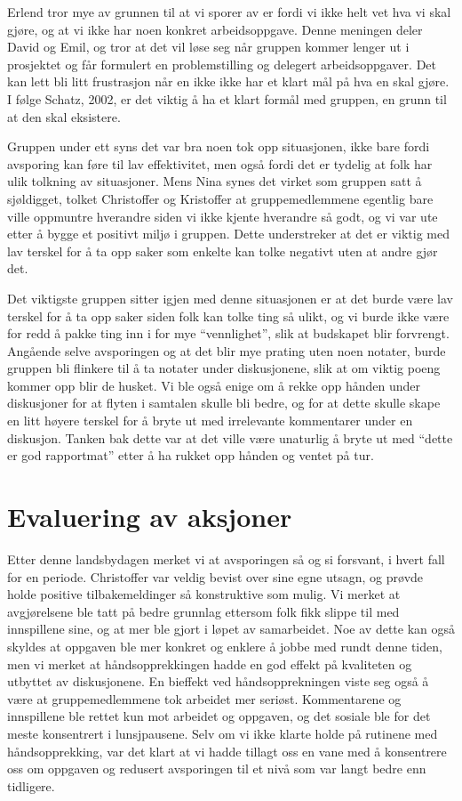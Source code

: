 Erlend tror mye av grunnen til at vi sporer av er fordi vi ikke helt vet hva vi skal gjøre, og at vi ikke har noen konkret 
arbeidsoppgave. Denne meningen deler David og Emil, og tror at det vil løse seg når gruppen kommer lenger ut i prosjektet og får 
formulert en problemstilling og delegert arbeidsoppgaver. Det kan lett bli litt frustrasjon når en ikke ikke har et klart mål på hva en 
skal gjøre. I følge Schatz, 2002, er det viktig å ha et klart formål med gruppen, en grunn til at den skal eksistere. \cite{Artikkel3}

Gruppen under ett syns det var bra noen tok opp situasjonen, ikke bare fordi avsporing kan føre til lav effektivitet, men også fordi det 
er tydelig at folk har ulik tolkning av situasjoner. Mens Nina synes det virket som gruppen satt å sjøldigget, tolket Christoffer og 
Kristoffer at gruppemedlemmene egentlig bare ville oppmuntre hverandre siden vi ikke kjente hverandre så godt, og vi var ute etter å 
bygge et positivt miljø i gruppen. Dette understreker at det er viktig med lav terskel for å ta opp saker som enkelte kan tolke negativt 
uten at andre gjør det.

Det viktigste gruppen sitter igjen med denne situasjonen er at det burde være lav terskel for å ta opp saker siden folk kan tolke ting så 
ulikt, og vi burde ikke være for redd å pakke ting inn i for mye ``vennlighet'', slik at budskapet blir forvrengt. Angående selve avsporingen 
og at det blir mye prating uten noen notater, burde gruppen bli flinkere til å ta notater under diskusjonene, slik at om viktig poeng 
kommer opp blir de husket. Vi ble også enige om å rekke opp hånden under diskusjoner for at flyten i samtalen skulle bli bedre, og for at dette skulle skape en litt høyere terskel for å bryte ut med irrelevante kommentarer under en diskusjon. Tanken bak dette var at det ville være unaturlig å bryte ut med ``dette er god rapportmat'' etter å ha rukket opp hånden og ventet på tur.

\section{Evaluering av aksjoner}

Etter denne landsbydagen merket vi at avsporingen så og si forsvant, i hvert fall for en periode. Christoffer var veldig bevist over sine egne utsagn, og prøvde holde positive tilbakemeldinger så konstruktive som mulig. Vi merket at avgjørelsene ble tatt på bedre grunnlag ettersom folk fikk slippe til med innspillene sine, og at mer ble gjort i løpet av samarbeidet. Noe av dette kan også skyldes at oppgaven ble mer konkret og enklere å jobbe med rundt denne tiden, men vi merket at håndsopprekkingen hadde en god effekt på kvaliteten og utbyttet av diskusjonene. En bieffekt ved håndsopprekningen viste seg også å være at gruppemedlemmene tok arbeidet mer seriøst. Kommentarene og innspillene ble rettet kun mot arbeidet og oppgaven, og det sosiale ble for det meste konsentrert i lunsjpausene. Selv om vi ikke klarte holde på rutinene med håndsopprekking, var det klart at vi hadde tillagt oss en vane med å konsentrere oss om oppgaven og redusert avsporingen til et nivå som var langt bedre enn tidligere.


